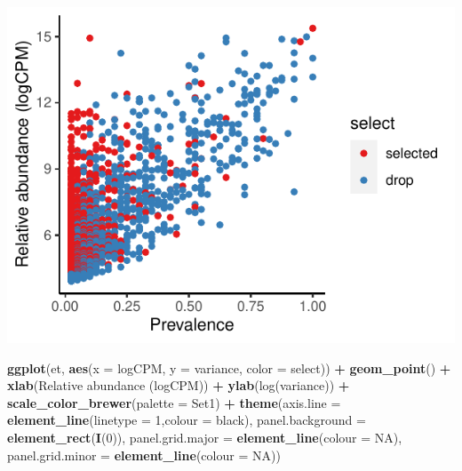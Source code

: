\documentclass[
]{article}
\newenvironment{Shaded}{\begin{snugshade}}{\end{snugshade}}
\newcommand{\AttributeTok}[1]{\textcolor[rgb]{0.13,0.29,0.53}{#1}}
\newcommand{\ConstantTok}[1]{\textcolor[rgb]{0.56,0.35,0.01}{#1}}
\newcommand{\DecValTok}[1]{\textcolor[rgb]{0.00,0.00,0.81}{#1}}
\newcommand{\FunctionTok}[1]{\textcolor[rgb]{0.13,0.29,0.53}{\textbf{#1}}}
\newcommand{\NormalTok}[1]{#1}
\newcommand{\SpecialCharTok}[1]{\textcolor[rgb]{0.81,0.36,0.00}{\textbf{#1}}}
\newcommand{\StringTok}[1]{\textcolor[rgb]{0.31,0.60,0.02}{#1}}
\begin{document}
\includegraphics{workshop_files/figure-latex/unnamed-chunk-52-4.pdf}

\begin{Shaded}
\begin{Highlighting}[]

\FunctionTok{ggplot}\NormalTok{(et, }\FunctionTok{aes}\NormalTok{(}\AttributeTok{x =}\NormalTok{ logCPM, }\AttributeTok{y =}\NormalTok{ variance, }\AttributeTok{color =}\NormalTok{ select)) }\SpecialCharTok{+} \FunctionTok{geom\_point}\NormalTok{() }\SpecialCharTok{+}
  \FunctionTok{xlab}\NormalTok{(}\StringTok{\textquotesingle{}Relative abundance (logCPM)\textquotesingle{}}\NormalTok{) }\SpecialCharTok{+} \FunctionTok{ylab}\NormalTok{(}\StringTok{\textquotesingle{}log(variance)\textquotesingle{}}\NormalTok{) }\SpecialCharTok{+} 
  \FunctionTok{scale\_color\_brewer}\NormalTok{(}\AttributeTok{palette =} \StringTok{\textquotesingle{}Set1\textquotesingle{}}\NormalTok{) }\SpecialCharTok{+}
  \FunctionTok{theme}\NormalTok{(}\AttributeTok{axis.line =} \FunctionTok{element\_line}\NormalTok{(}\AttributeTok{linetype =} \DecValTok{1}\NormalTok{,}\AttributeTok{colour =} \StringTok{\textquotesingle{}black\textquotesingle{}}\NormalTok{),}
        \AttributeTok{panel.background =} \FunctionTok{element\_rect}\NormalTok{(}\FunctionTok{I}\NormalTok{(}\DecValTok{0}\NormalTok{)),}
        \AttributeTok{panel.grid.major =} \FunctionTok{element\_line}\NormalTok{(}\AttributeTok{colour =} \ConstantTok{NA}\NormalTok{),}
        \AttributeTok{panel.grid.minor =} \FunctionTok{element\_line}\NormalTok{(}\AttributeTok{colour =} \ConstantTok{NA}\NormalTok{))}
\end{Highlighting}
\end{Shaded}
\end{document}
